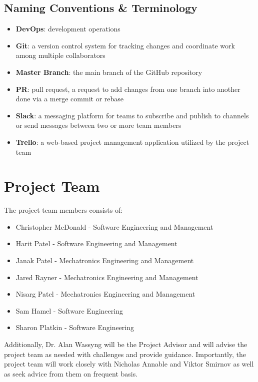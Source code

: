 \documentclass[11pt]{article}
\begin{document}
\subsection{Naming Conventions \& Terminology}
\begin{itemize}
\item \textbf{DevOps}: development operations
\item \textbf{Git}: a version control system for tracking changes and coordinate work among multiple collaborators
\item \textbf{Master Branch}: the main branch of the GitHub repository
\item \textbf{PR}: pull request, a request to add changes from one branch into another done via a merge commit or rebase
\item \textbf{Slack}: a messaging platform for teams to subscribe and publish to channels or send messages between two or more team members
\item \textbf{Trello}: a web-based project management application utilized by the project team
\end{itemize}

\section{Project Team}
The project team members consists of:
\begin{itemize}
\item Christopher McDonald - Software Engineering and Management
\item Harit Patel - Software Engineering and Management
\item Janak Patel - Mechatronics Engineering and Management
\item Jared Rayner - Mechatronics Engineering and Management
\item Nisarg Patel - Mechatronics Engineering and Management
\item Sam Hamel - Software Engineering
\item Sharon Platkin - Software Engineering
\end{itemize}
Additionally, Dr. Alan Wassyng will be the Project Advisor and will advise the project team as needed with challenges and provide guidance. Importantly, the project team will work closely with Nicholas Annable and Viktor Smirnov as well as seek advice from them on frequent basis.
\end{document}

